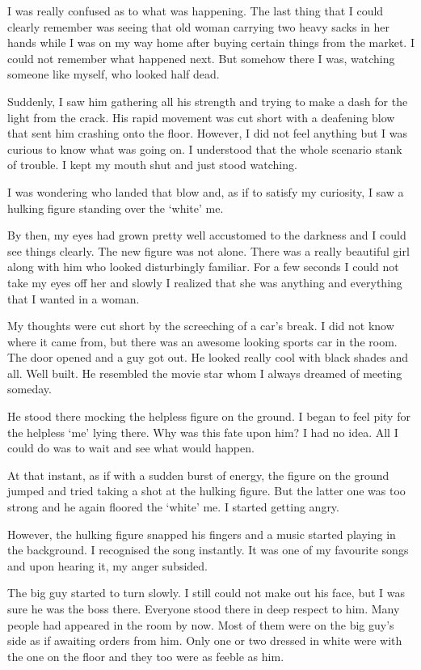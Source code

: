 \documentclass[twoside,11pt,titlepage]{article}
\begin{document}
I was really confused as to what was happening. The last thing that I could clearly remember was seeing that old woman carrying two heavy sacks in her hands while I was on my way home after buying certain things from the market. I could not remember what happened next. But somehow there I was, watching someone like myself, who looked half dead.

Suddenly, I saw him gathering all his strength and trying to make a dash for the light from the crack. His rapid movement was cut short with a deafening blow that sent him crashing onto the floor. However, I did not feel anything but I was curious to know what was going on. I understood that the whole scenario stank of trouble. I kept my mouth shut and just stood watching.

I was wondering who landed that blow and, as if to satisfy my curiosity, I saw a hulking figure standing over the `white' me.

By then, my eyes had grown pretty well accustomed to the darkness and I could see things clearly. The new figure was not alone. There was a really beautiful girl along with him who looked disturbingly familiar. For a few seconds I could not take my eyes off her and slowly I realized that she was anything and everything that I wanted in a woman.

My thoughts were cut short by the screeching of a car's break. I did not know where it came from, but there was an awesome looking sports car in the room. The door opened and a guy got out. He looked really cool with black shades and all. Well built. He resembled the movie star whom I always dreamed of meeting someday.

He stood there mocking the helpless figure on the ground. I began to feel pity for the helpless `me' lying there. Why was this fate upon him? I had no idea. All I could do was to wait and see what would happen.

At that instant, as if with a sudden burst of energy, the figure on the ground jumped and tried taking a shot at the hulking figure. But the latter one was too strong and he again floored the `white' me. I started getting angry.

However, the hulking figure snapped his fingers and a music started playing in the background. I recognised the song instantly. It was one of my favourite songs and upon hearing it, my anger subsided.

The big guy started to turn slowly. I still could not make out his face, but I was sure he was the boss there. Everyone stood there in deep respect to him. Many people had appeared in the room by now. Most of them were on the big guy's side as if awaiting orders from him. Only one or two dressed in white were with the one on the floor and they too were as feeble as him.
\end{document}
